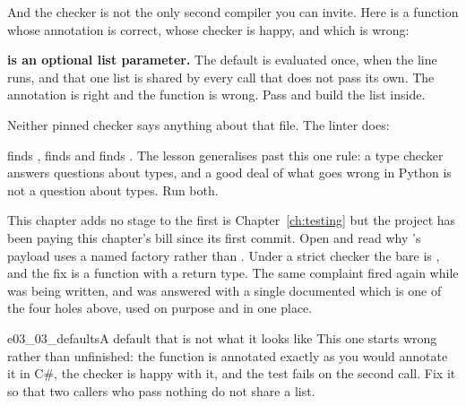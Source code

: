 And the checker is not the only second compiler you can invite. Here is a
function whose annotation is correct, whose checker is happy, and which is
wrong:



\begin{trapbox}
\textbf{ is an optional list parameter.}
The default is evaluated once, when the  line runs, and that one
list is shared by every call that does not pass its own. The annotation is
right and the function is wrong. Pass  and build the list inside.
\end{trapbox}

\noindent
Neither pinned checker says anything about that file. The linter does:


\noindent
{} finds ,  finds
 and  finds . The
lesson generalises past this one rule: a type checker answers questions about
types, and a good deal of what goes wrong in Python is not a question about
types. Run both.

\begin{projectbox}
This chapter adds no stage to  \dash{} the first is
Chapter~\ref{ch:testing} \dash{} but the project has been paying this
chapter's bill since its first commit. Open
 and read why 's
payload uses a named factory rather than . Under
a strict checker the bare  is , and
the fix is a function with a return type. The same complaint fired again
while  was being written, and was answered with a
single documented  \dash{} which is one of the four holes above,
used on purpose and in one place.
\end{projectbox}

\begin{exercise}{e03_03_defaults}{A default that is not what it looks like}
This one starts wrong rather than unfinished: the function is annotated
exactly as you would annotate it in C\#, the checker is happy with it, and
the test fails on the second call. Fix it so that two callers who pass
nothing do not share a list.
\end{exercise}

